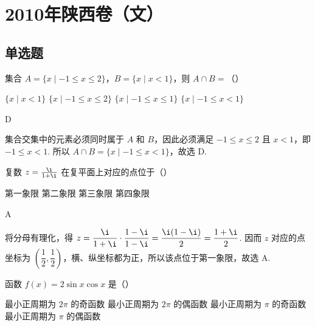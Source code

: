 \chapter{2010年陕西卷（文）}

\section{单选题}

\begin{problem}
集合 \(A = \{x \mid -1 \leqslant x \leqslant 2\}\)，\(B = \{x \mid x < 1\}\)，则 \(A \cap B =\)（\quad）

\choices
    {\( \{x \mid x < 1\} \)}
    {\(\{x\mid -1\leqslant x\leqslant 2\}\)}
    {\( \{x \mid -1 \leqslant x \leqslant 1\} \)}
    {\(\{x\mid -1 \leqslant x < 1\}\)}
\end{problem}

\begin{answer}
D
\end{answer}

\begin{solution}
集合交集中的元素必须同时属于 \(A\) 和 \(B\)，因此必须满足 \(-1\leqslant x\leqslant2\) 且 \(x<1\)，即 \(-1\leqslant x<1\). 所以 \(A\cap B=\{x\mid -1\leqslant x<1\}\)，故选 D.
\end{solution}

\begin{problem}
复数 \(z = \frac{\i}{1 + \i}\) 在复平面上对应的点位于（\quad）

\choices
    {第一象限}
    {第二象限}
    {第三象限}
    {第四象限}
\end{problem}

\begin{answer}
A
\end{answer}

\begin{solution}
将分母有理化，得 \(z=\dfrac{\i}{1+\i}\cdot\dfrac{1-\i}{1-\i}=\dfrac{\i(1-\i)}{2}=\dfrac{1+\i}{2}\). 因而 \(z\) 对应的点坐标为 \(\left(\dfrac12,\dfrac12\right)\)，横、纵坐标都为正，所以该点位于第一象限，故选 A.
\end{solution}

\begin{problem}
函数 \( f(x) = 2\sin x\cos x \) 是（\quad）

\choices
    {最小正周期为 \(2\pi\) 的奇函数}
    {最小正周期为 \(2\pi\) 的偶函数}
    {最小正周期为 \(\pi\) 的奇函数}
    {最小正周期为 \(\pi\) 的偶函数}
\end{problem}

